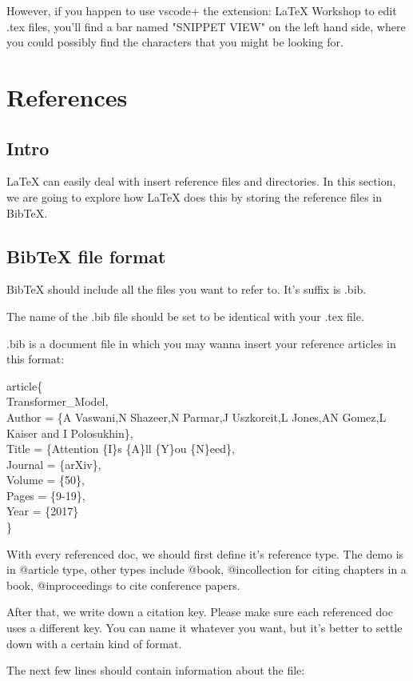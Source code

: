\documentclass[a4paper,12pt]{article}
\begin{document}
 However, if you happen to use vscode+ the extension: LaTeX Workshop
 to edit .tex files, you'll find a bar named {\scriptsize{"SNIPPET VIEW"}} on the 
 left hand side, where you could possibly find the characters that
 you might be looking for.
\section{References}
\subsection{Intro}
LaTeX can easily deal with insert reference files and directories.
In this section, we are going to explore how LaTeX does this
by storing the reference files in BibTeX. 
\subsection{BibTeX file format}

BibTeX should include all the files you want to refer to.
It's suffix is .bib.

The name of the .bib file should be set to be identical with your .tex file.

.bib is a document file in which you may wanna insert your reference articles in this format:

\noindent@ article\{\\
    Transformer\_{}Model,\\
    Author = \{A Vaswani,N Shazeer,N Parmar,J Uszkoreit,L Jones,AN Gomez,L Kaiser and I Polosukhin\},\\
    Title = \{Attention \{I\}s \{A\}ll \{Y\}ou \{N\}eed\},\\
    Journal = \{arXiv\},\\
    Volume = \{50\},\\
    Pages = \{9-19\},\\
    Year = \{2017\} \\
\}

With every referenced doc, we should first define it's 
reference type.
The demo is in @article type, other types include 
@book, @incollection for citing chapters in a book,
@inproceedings to cite conference papers.

After that, we write down a citation key.
Please make sure each referenced doc uses a different key.
You can name it whatever you want, but it's better to settle down
with a certain kind of format.

The next few lines should contain information about the file:
\end{document}

